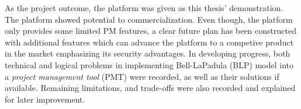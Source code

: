 As the project outcome, the platform was given as this thesis' demonstration.
The platform showed potential to commercialization.
Even though, the platform only provides some limited PM features, a clear future plan has been constructed with additional features which can advance the platform to a competive product in the market emphasizing its security advantages.
In developing progress, both technical and logical problems in implementing Bell-LaPadula (BLP) model into a \emph{project management tool} (PMT) were recorded, as well as their solutions if available.
Remaining limitations, and trade-offs were also recorded and explained for later improvement.

\endgroup			

\vfill
